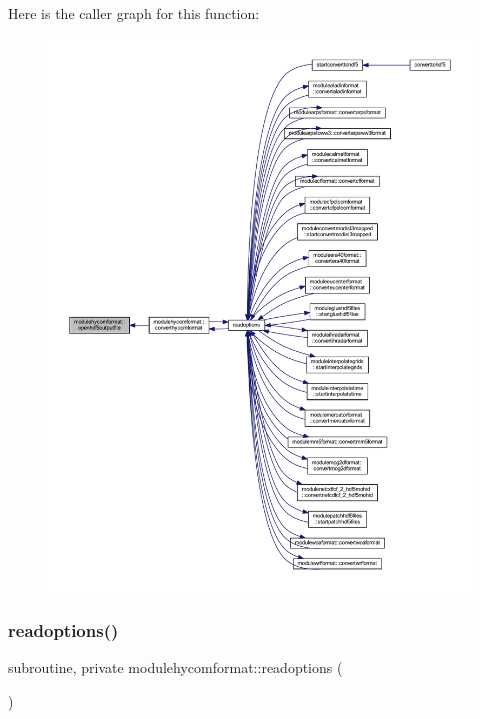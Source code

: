 Here is the caller graph for this function\+:\nopagebreak
\begin{figure}[H]
\begin{center}
\leavevmode
\includegraphics[width=350pt]{namespacemodulehycomformat_a87713c6e54c1c8b7b1a0fd423c3a6acf_icgraph}
\end{center}
\end{figure}
\mbox{\label{namespacemodulehycomformat_ad11177b2f2e56107ff56b45f4e7e04ef}} 
\subsubsection{\texorpdfstring{readoptions()}{readoptions()}}
{\footnotesize\ttfamily subroutine, private modulehycomformat\+::readoptions (\begin{DoxyParamCaption}{ }\end{DoxyParamCaption})\hspace{0.3cm}{\ttfamily [private]}}



